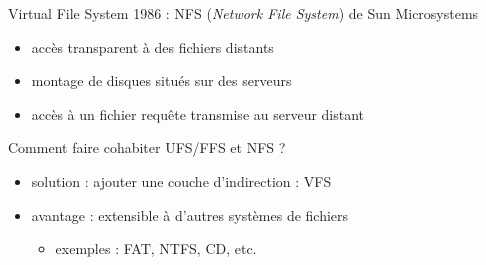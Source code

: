 \begin {frame} {Virtual File System}
    1986 : NFS (\textit {Network File System}) de Sun Microsystems

    \begin {itemize}
	\item accès transparent à des fichiers distants
	\item montage de disques situés sur des serveurs
	\item accès à un fichier \implique requête transmise
	    au serveur distant
    \end {itemize}

    \vspace* {3mm}

    Comment faire cohabiter UFS/FFS et NFS ?
    \begin {itemize}
	\item solution : ajouter une couche d'indirection : VFS
	\item avantage : extensible à d'autres systèmes de fichiers
	    \begin {itemize}
		\item exemples : FAT, NTFS, CD, etc.
	    \end {itemize}
    \end {itemize}
\end {frame}

